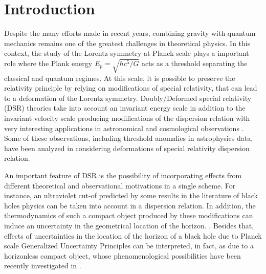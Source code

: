 \documentclass[final,5p,times,twocolumn]{elsarticle}
\begin{document}
\section{Introduction}
\label{sec:intro}

 Despite the many efforts made in recent years, combining gravity with quantum mechanics remains one of  the greatest challenges in theoretical physics. In this context, the study of the Lorentz symmetry at Planck scale plays a important role where the Plank energy $E_p=\sqrt{\hbar c^5 / G}$ acts as a  threshold separating the classical and quantum regimes. At this scale, it is possible to preserve the relativity principle by relying on modifications of special relativity, that can lead to  a deformation  of the Lorentz symmetry. %
Doubly/Deformed special relativity (DSR) theories take into account an invariant energy scale in addition to the invariant velocity scale producing modifications of the dispersion relation with very interesting applications in  astronomical and cosmological observations \cite{magueijo}. Some of these observations, including threshold anomalies in astrophysics data, have been analyzed in \cite{dispersao,dispersao3,dispersao4,dispersao5} considering deformations of special relativity dispersion relation.

An important feature of DSR is the possibility of incorporating effects from different theoretical and observational motivations in a single scheme. For instance, an ultraviolet cut-of predicted by some results in the literature of black holes physics \cite{dispersao6,dispersao7} can be taken into account in a dispersion relation. In addition, the thermodynamics of such a compact object produced by these modifications can induce an uncertainty in the geometrical location of the horizon. \cite{lobo2020effects}. Besides that, effects of uncertainties in the location of the horizon of a black hole due to Planck scale Generalized Uncertainty Principles can be interpreted, in fact, as due to a horizonless compact object, whose phenomenological possibilities have been recently investigated in \cite{Buoninfante:2020cqz}.
\end{document}
